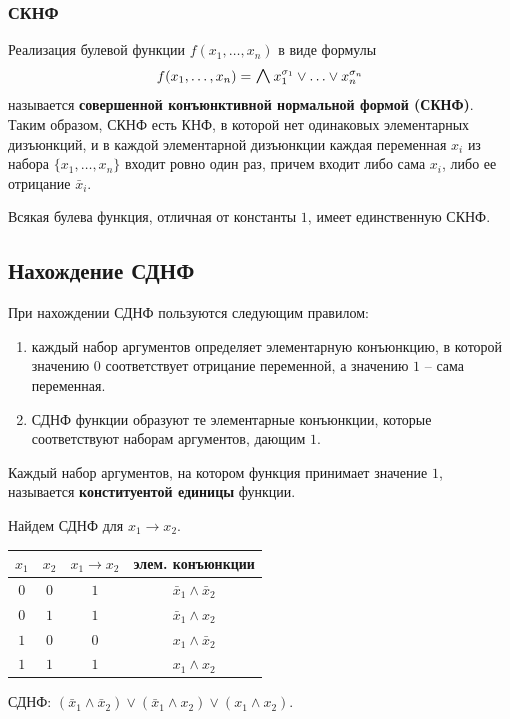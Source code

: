 \subsubsection{СКНФ}

Реализация булевой функции \(f(x_1, \ldots, x_n)\) в виде формулы
\[
    f(x_1, \ldots, x_n) = \bigland x_1^{\sigma_1} \lor \ldots \lor x_n^{\sigma_n}
\]
называется \textbf{совершенной конъюнктивной нормальной формой (СКНФ)}. Таким образом, СКНФ есть КНФ, в которой нет одинаковых элементарных дизъюнкций, и в каждой элементарной дизъюнкции каждая переменная \(x_i\) из набора \(\{x_1, \ldots, x_n\}\) входит ровно один раз, причем входит либо сама \(x_i\), либо ее отрицание \(\bar{x}_i\).

\begin{theorem*}
    Всякая булева функция, отличная от константы \(1\), имеет единственную СКНФ.
\end{theorem*}

\subsection{Нахождение СДНФ}

\noindent При нахождении СДНФ пользуются следующим правилом:
\begin{enumerate}
    \item каждый набор аргументов определяет элементарную конъюнкцию, в которой значению \(0\) соответствует отрицание переменной, а значению \(1\) -- сама переменная.
    \item СДНФ функции образуют те элементарные конъюнкции, которые соответствуют наборам аргументов, дающим \(1\).
\end{enumerate}

Каждый набор аргументов, на котором функция принимает значение \(1\), называется \textbf{конституентой единицы} функции.

\begin{example*}
    Найдем СДНФ для \(x_1 \to x_2\).

        {
            \renewcommand{\arraystretch}{1.5}
            \begin{longtable}{|c|c|c|c|}
                \hline
                \(x_1\) & \(x_2\) & \(x_1 \to x_2\) & элем. конъюнкции              \\
                \hline
                \(0\)   & \(0\)   & \(1\)           & \(\bar{x}_1 \land \bar{x}_2\) \\
                \hline
                \(0\)   & \(1\)   & \(1\)           & \(\bar{x}_1 \land x_2\)       \\
                \hline
                \(1\)   & \(0\)   & \(0\)           & \(x_1 \land \bar{x}_2\)       \\
                \hline
                \(1\)   & \(1\)   & \(1\)           & \(x_1 \land x_2\)             \\
                \hline
            \end{longtable}
        }

    СДНФ: \((\bar{x}_1 \land \bar{x}_2) \lor (\bar{x}_1 \land x_2) \lor (x_1 \land x_2)\).
\end{example*}

